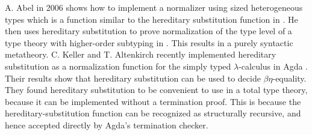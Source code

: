 A. Abel in 2006 shows how to implement a normalizer using sized
heterogeneous types which is a function similar to the hereditary
substitution function in \cite{Abel:2006}.  He then uses hereditary
substitution to prove normalization of the type level of a type theory
with higher-order subtyping in \cite{Abel:2008}.  This results in a
purely syntactic metatheory.  C. Keller and T. Altenkirch recently
implemented hereditary substitution as a normalization function for
the simply typed $\lambda$-calculus in Agda \cite{Keller:2010}.  Their
results show that hereditary substitution can be used to decide $\beta
\eta$-equality.  They found hereditary substitution to be convenient
to use in a total type theory, because it can be implemented without a
termination proof.  This is because the hereditary-substitution
function can be recognized as structurally recursive, and hence
accepted directly by Agda's termination checker.

